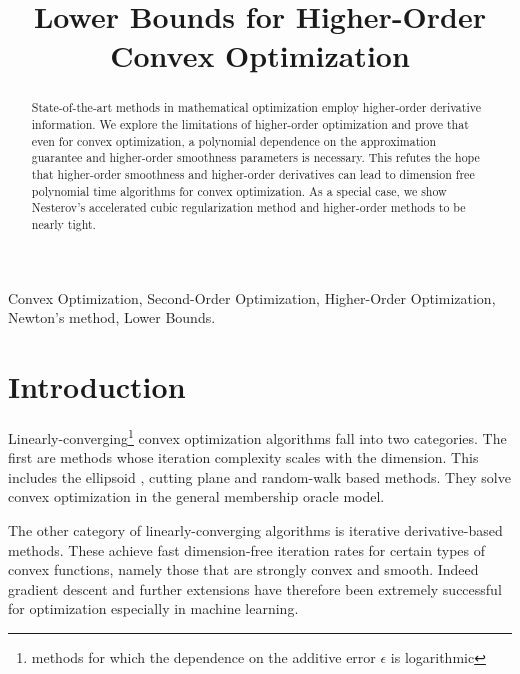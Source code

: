 \documentclass[final,12pt]{colt2018} %
\title[Lower Bounds for Higher-Order Convex Optimization]{Lower Bounds for Higher-Order Convex Optimization}
\begin{document}
\maketitle

\begin{abstract}
State-of-the-art methods in mathematical optimization employ higher-order derivative information. We explore the limitations of higher-order optimization and prove that even for convex optimization, a polynomial dependence on the approximation guarantee and higher-order smoothness parameters is necessary. This refutes the hope that higher-order smoothness and higher-order derivatives can lead to dimension free polynomial time algorithms for convex optimization. As a special case, we show Nesterov's accelerated cubic regularization method and higher-order methods to be nearly tight. 
\end{abstract}

\begin{keywords}
Convex Optimization, Second-Order Optimization, Higher-Order Optimization, Newton's method, Lower Bounds.
\end{keywords}

\section{Introduction}

Linearly-converging\footnote{methods for which the dependence on the additive error $\epsilon$ is logarithmic}  convex optimization algorithms  fall into two categories.   The first are methods whose iteration complexity scales with the dimension. This includes the ellipsoid \citep{khachiyan1980polynomial,grotschel2012geometric}, cutting plane \citep{vaidya1989new,lee2015faster} and random-walk \citep{bertsimas2004solving,kalai2006simulated,lovasz2006fast} based methods. They solve convex optimization in the general membership oracle model. 

The other category of linearly-converging algorithms is iterative derivative-based methods. These achieve fast dimension-free iteration rates for certain types of convex functions, namely those that are strongly convex and smooth. Indeed gradient descent and further extensions have therefore been extremely successful for optimization especially in machine learning.
\end{document}
